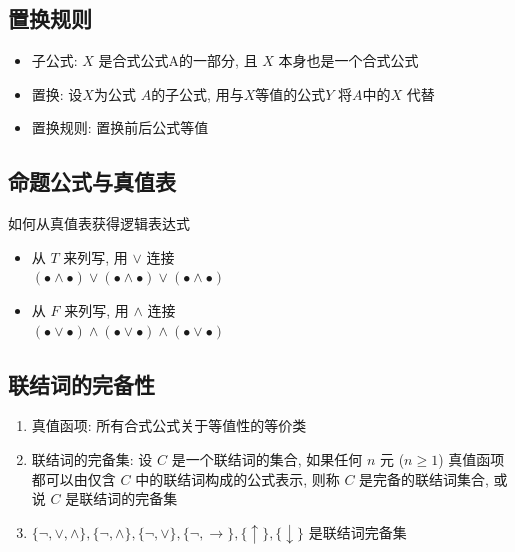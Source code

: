 \documentclass[11pt,a4paper,twocolumn,fleqn]{article} %
\begin{document}
\subsection{置换规则} %
\label{sub:sub_rule}
\begin{itemize}
	\item 子公式: $X$ 是合式公式A的一部分, 且 $X$ 本身也是一个合式公式
	\item 置换: 设$X$为公式 $A$的子公式, 用与$X$等值的公式$Y$ 将$A$中的$X$ 代替
	\item 置换规则: 置换前后公式等值
\end{itemize}
\subsection{命题公式与真值表} %
\label{sub:equ_and_bool}
如何从真值表获得逻辑表达式
\begin{itemize}
	\item 从 $T$ 来列写, 用 $\lor$ 连接\\
	$(\bullet\land\bullet)\lor(\bullet\land\bullet)\lor(\bullet\land\bullet)$
	\item 从 $F$ 来列写, 用 $\land$ 连接\\
	$(\bullet\lor\bullet)\land(\bullet\lor\bullet)\land(\bullet\lor\bullet)$
\end{itemize}
\subsection{联结词的完备性} %
\label{sub:comple}
\begin{enumerate}
	\item 真值函项: 所有合式公式关于等值性的等价类
	\item 联结词的完备集: 设 $C$ 是一个联结词的集合, 如果任何 $n$ 元 ($ n\ge 1$)
	真值函项都可以由仅含 $C$ 中的联结词构成的公式表示, 
	则称 $C$ 是完备的联结词集合, 或说 $C$ 是联结词的完备集
	\item $\{\lnot, \lor, \land\}, 
	\{\lnot, \land\}, 
	\{\lnot, \lor\}, 
	\{\lnot, \to\}, 
	\{\uparrow\}, \{\downarrow\}$ 是联结词完备集
\end{enumerate}
\end{document}
